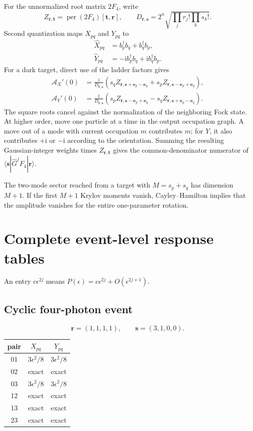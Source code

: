 \documentclass[aps,pra,onecolumn,amsmath,amssymb,superscriptaddress,longbibliography]{revtex4-2}
\newcommand{\ii}{\mathrm{i}}
\newcommand{\per}{\operatorname{per}}
\newcommand{\evec}{\bm e}
\begin{document}
For the unnormalized root matrix $2F_4$, write
\begin{equation}
Z_{\bm r,\bm t}=\per(2F_4)[\bm t,\bm r],
\qquad
D_{\bm r,\bm s}=2^n
\sqrt{\prod_jr_j!\prod_ks_k!}.
\end{equation}
Second quantization maps $X_{pq}$ and $Y_{pq}$ to
\begin{align}
\widehat X_{pq}&=b_p^\dagger b_q+b_q^\dagger b_p,\nonumber\\
\widehat Y_{pq}&=-\ii b_p^\dagger b_q+\ii b_q^\dagger b_p.
\end{align}
For a dark target, direct use of the ladder factors gives
\begin{align}
\mathcal A_X'(0)
&=\frac{\ii}{D_{\bm r,\bm s}}
\left(s_qZ_{\bm r,\bm s+\evec_p-\evec_q}
+s_pZ_{\bm r,\bm s-\evec_p+\evec_q}\right),
\label{supp:eq:x-tangent}\\
\mathcal A_Y'(0)
&=\frac{1}{D_{\bm r,\bm s}}
\left(s_pZ_{\bm r,\bm s-\evec_p+\evec_q}
-s_qZ_{\bm r,\bm s+\evec_p-\evec_q}\right).
\label{supp:eq:y-tangent}
\end{align}
The square roots cancel against the normalization of the neighboring Fock
state.  At higher order, move one particle at a time in the output
occupation graph.  A move out of a mode with current occupation $m$
contributes $m$; for $Y$, it also contributes $+\ii$ or $-\ii$ according
to the orientation.  Summing the resulting Gaussian-integer weights times
$Z_{\bm r,\bm t}$ gives the common-denominator numerator of
$\langle\bm s|\widehat G^jF_4|\bm r\rangle$.

The two-mode sector reached from a target with $M=s_p+s_q$ has dimension
$M+1$.  If the first $M+1$ Krylov moments vanish, Cayley--Hamilton implies
that the amplitude vanishes for the entire one-parameter rotation.

\section{Complete event-level response tables}

An entry $c\epsilon^{2j}$ means
$P(\epsilon)=c\epsilon^{2j}+O(\epsilon^{2j+1})$.

\subsection{Cyclic four-photon event}

\begin{equation}
\bm r=(1,1,1,1),\qquad \bm s=(3,1,0,0).
\end{equation}
\begin{center}
\begin{tabular}{ccc}
\toprule
pair&$X_{pq}$&$Y_{pq}$\\
\midrule
01&$3\epsilon^2/8$&$3\epsilon^2/8$\\
02&exact&exact\\
03&$3\epsilon^2/8$&$3\epsilon^2/8$\\
12&exact&exact\\
13&exact&exact\\
23&exact&exact\\
\bottomrule
\end{tabular}
\end{center}
\end{document}
